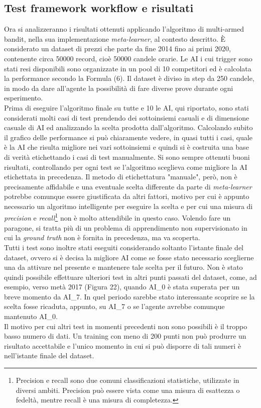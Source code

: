 \documentclass[a4paper,12pt]{report}
\begin{document}
\begin{fig}
\section{Test framework workflow e risultati}
Ora si analizzeranno i risultati ottenuti applicando l'algoritmo di multi-armed bandit, nella sua implementazione \textit{meta-learner}, al contesto descritto. È considerato un dataset di prezzi che parte da fine 2014 fino ai primi 2020, contenente circa 50000 record, cioè 50000 candele orarie. Le AI i cui trigger sono stati resi disponibili sono organizzate in un pool di 10 competitori ed è calcolata la performance secondo la Formula (6). Il dataset è diviso in step da 250 candele, in modo da dare all'agente la possibilità di fare diverse prove durante ogni esperimento.\\ Prima di eseguire l'algoritmo finale su tutte e 10 le AI, qui riportato, sono stati considerati molti casi di test prendendo dei sottoinsiemi casuali e di dimensione casuale di AI ed analizzando la scelta prodotta dall'algoritmo. Calcolando subito il grafico delle performance si può chiaramente vedere, in quasi tutti i casi, quale è la AI che risulta migliore nei vari sottoinsiemi e quindi si è costruita una base di verità etichettando i casi di test manualmente. Si sono sempre ottenuti buoni risultati, controllando per ogni test se l'algoritmo sceglieva come migliore la AI etichettata in precedenza. Il metodo di etichettatura "manuale", però, non è precisamente affidabile e una eventuale scelta differente da parte di \textit{meta-learner} potrebbe comunque essere giustificata da altri fattori, motivo per cui è appunto necessario un algoritmo intelligente per eseguire la scelta e per cui una misura di \textit{precision} e \textit{recall}\footnote{Precision e recall sono due comuni classificazioni statistiche, utilizzate in diversi ambiti. Precision può essere vista come una misura di esattezza o fedeltà, mentre recall è una misura di completezza.} non è molto attendibile in questo caso. Volendo fare un paragone, si tratta più di un problema di apprendimento non supervisionato in cui la \textit{ground truth} non è fornita in precedenza, ma va scoperta.\\Tutti i test sono inoltre stati eseguiti considerando soltanto l'istante finale del dataset, ovvero si è decisa la migliore AI come se fosse stato necessario sceglierne una da attivare nel presente e mantenere tale scelta per il futuro. Non è stato quindi possibile effettuare ulteriori test in altri punti passati del dataset, come, ad esempio, verso metà 2017 (Figura 22), quando AI\_0 è stata superata per un breve momento da AI\_7. In quel periodo sarebbe stato interessante scoprire se la scelta fosse ricaduta, appunto, su AI\_7 o se l'agente avrebbe comunque mantenuto AI\_0.\\ Il motivo per cui altri test in momenti precedenti non sono possibili è il troppo basso numero di dati. Un training con meno di 200 punti non può produrre un risultato accettabile e l'unico momento in cui si può disporre di tali numeri è nell'istante finale del dataset.

\end{fig}
\end{document}
